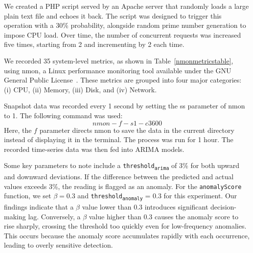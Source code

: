 \documentclass[pdflatex,sn-nature]{sn-jnl}%
\theoremstyle{thmstyleone}%
\theoremstyle{thmstyletwo}%
\theoremstyle{thmstylethree}%
\begin{document}
We created a PHP script served by an Apache server that randomly loads a large plain text file and echoes it back. The script was designed to trigger this operation with a 30\% probability, alongside random prime number generation to impose CPU load. Over time, the number of concurrent requests was increased five times, starting from 2 and incrementing by 2 each time.

We recorded 35 system-level metrics, as shown in Table~\ref{nmonmetricstable}, using nmon, a Linux performance monitoring tool available under the GNU General Public License~\cite{nmon}. These metrics are grouped into four major categories: (i) CPU, (ii) Memory, (iii) Disk, and (iv) Network.

Snapshot data was recorded every 1 second by setting the ss parameter of nmon to 1. The following command was used:
\[ nmon -f -s 1 -c 3600 \]
Here, the $f$ parameter directs nmon to save the data in the current directory instead of displaying it in the terminal. The process was run for 1 hour. The recorded time-series data was then fed into ARIMA models.

Some key parameters to note include a \texttt{threshold\textsubscript{arima}} of 3\% for both upward and downward deviations. If the difference between the predicted and actual values exceeds 3\%, the reading is flagged as an anomaly. For the \texttt{anomalyScore} function, we set $\beta=0.3$ and \texttt{threshold\textsubscript{anomaly}} = 0.3 for this experiment. Our findings indicate that a $\beta$ value lower than 0.3 introduces significant decision-making lag. Conversely, a $\beta$ value higher than 0.3 causes the anomaly score to rise sharply, crossing the threshold too quickly even for low-frequency anomalies. This occurs because the anomaly score accumulates rapidly with each occurrence, leading to overly sensitive detection.
\end{document}
